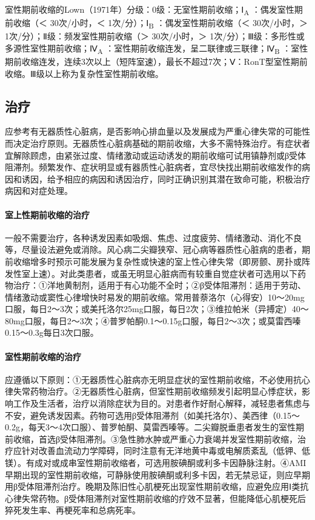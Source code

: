室性期前收缩的Lown（1971年）分级：0级：无室性期前收缩；Ⅰ\textsubscript{A}
：偶发室性期前收缩（＜ 30次/小时，＜ 1次/分）；Ⅰ\textsubscript{B}
：偶发室性期前收缩（＜ 30次/小时，＞ 1次/分）；Ⅱ级：频发室性期前收缩（＞
30次/小时，＞
1次/分）；Ⅲ级：多形性或多源性室性期前收缩；Ⅳ\textsubscript{A}
：室性期前收缩连发，呈二联律或三联律；Ⅳ\textsubscript{B}
：室性期前收缩连发，连续3次以上（短阵室速），最长不超过7次；Ⅴ：RonT型室性期前收缩。Ⅲ级以上称为复杂性室性期前收缩。

\subsection{治疗}

应参考有无器质性心脏病，是否影响心排血量以及发展成为严重心律失常的可能性而决定治疗原则。无器质性心脏病基础的期前收缩，大多不需特殊治疗。有症状者宜解除顾虑，由紧张过度、情绪激动或运动诱发的期前收缩可试用镇静剂或β受体阻滞剂。频繁发作、症状明显或有器质性心脏病者，宜尽快找出期前收缩发作的病因和诱因，给予相应的病因和诱因治疗，同时正确识别其潜在致命可能，积极治疗病因和对症处理。

\paragraph{室上性期前收缩的治疗}

一般不需要治疗，各种诱发因素如吸烟、焦虑、过度疲劳、情绪激动、消化不良等，尽量设法避免或消除。风心病二尖瓣狭窄、冠心病等器质性心脏病的患者，期前收缩增多时预示可能发展为复杂性或快速的室上性心律失常（即房颤、房扑或阵发性室上速）。对此类患者，或虽无明显心脏病而有较重自觉症状者可选用以下药物治疗：①洋地黄制剂，适用于有心功能不全时；②β受体阻滞剂：适用于劳动、情绪激动或窦性心律增快时易发的期前收缩。常用普萘洛尔（心得安）10～20mg口服，每日2～3次；或美托洛尔25mg口服，每日2次；③维拉帕米（异搏定）40～80mg口服，每日2～3次；④普罗帕酮0.1～0.15g口服，每日2～3次；或莫雷西嗪0.15～0.3g每日3次口服。

\paragraph{室性期前收缩的治疗}

应遵循以下原则：①无器质性心脏病亦无明显症状的室性期前收缩，不必使用抗心律失常药物治疗。②无器质性心脏病，但室性期前收缩频发引起明显心悸症状，影响工作及生活者，治疗以消除症状为目的。对患者作好耐心解释，减轻患者焦虑与不安，避免诱发因素。药物可选用β受体阻滞剂（如美托洛尔）、美西律（0.15～0.2g，每天3～4次口服）、普罗帕酮、莫雷西嗪等。二尖瓣脱垂患者发生的室性期前收缩，首选β受体阻滞剂。③急性肺水肿或严重心力衰竭并发室性期前收缩，治疗应针对改善血流动力学障碍，同时注意有无洋地黄中毒或电解质紊乱（低钾、低镁）。有成对或成串室性期前收缩者，可选用胺碘酮或利多卡因静脉注射。④AMI早期出现的室性期前收缩，可静脉使用胺碘酮或利多卡因，若无禁忌证，则应早期用β受体阻滞剂治疗。晚期及陈旧性心肌梗死出现室性期前收缩，应避免应用Ⅰ类抗心律失常药物。β受体阻滞剂对室性期前收缩的疗效不显著，但能降低心肌梗死后猝死发生率、再梗死率和总病死率。

